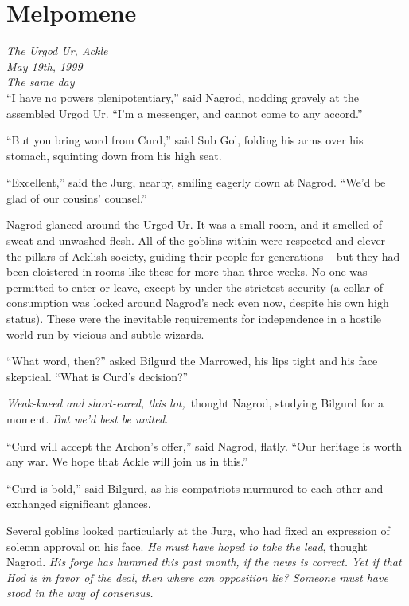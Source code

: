 \hypertarget{melpomene}{%
\chapter{Melpomene}\label{melpomene}}

\emph{The Urgod Ur, Ackle}\\
\emph{May 19th, 1999}\\
\emph{The same day}\\

``I have no powers plenipotentiary,'' said Nagrod, nodding gravely at
the assembled Urgod Ur. ``I'm a messenger, and cannot come to any
accord.''

``But you bring word from Curd,'' said Sub Gol, folding his arms over
his stomach, squinting down from his high seat.

``Excellent,'' said the Jurg, nearby, smiling eagerly down at Nagrod.
``We'd be glad of our cousins' counsel.''

Nagrod glanced around the Urgod Ur. It was a small room, and it smelled
of sweat and unwashed flesh. All of the goblins within were respected
and clever -- the pillars of Acklish society, guiding their people for
generations -- but they had been cloistered in rooms like these for more
than three weeks. No one was permitted to enter or leave, except by
under the strictest security (a collar of consumption was locked around
Nagrod's neck even now, despite his own high status). These were the
inevitable requirements for independence in a hostile world run by
vicious and subtle wizards.

``What word, then?'' asked Bilgurd the Marrowed, his lips tight and his
face skeptical. ``What is Curd's decision?''

\emph{Weak-kneed and short-eared, this lot,}~thought Nagrod, studying
Bilgurd for a moment. \emph{But we'd best be united.}

``Curd will accept the Archon's offer,'' said Nagrod, flatly. ``Our
heritage is worth any war. We hope that Ackle will join us in this.''

``Curd is bold,'' said Bilgurd, as his compatriots murmured to each
other and exchanged significant glances.

Several goblins looked particularly at the Jurg, who had fixed an
expression of solemn approval on his face. \emph{He must have hoped to
take the lead}, thought Nagrod. \emph{His forge has hummed this past
month, if the news is correct. Yet if that Hod is in favor of the deal,
then where can opposition lie? Someone must have stood in the way of
consensus.}

